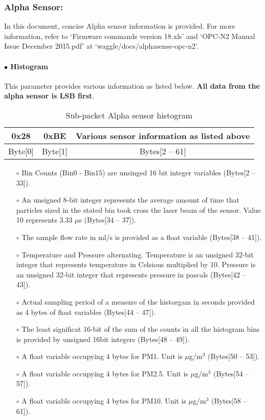 
\subsubsection{Alpha Sensor:}
In this document, concise Alpha sensor information is provided. For more information, refer to `Firmware commands version 18.xls' and `OPC-N2 Manual Issue December 2015.pdf' at `waggle/docs/alphasense-opc-n2'.

\paragraph{$\bullet$ Histogram}
This parameter provides various information as listed below. \textbf{All data from the alpha sensor is LSB first}. 


\begin{table}[h!]
    \centering
    \caption{Sub-packet Alpha sensor histogram}
    \begin{tabular}{|c|c|c|}
        \hline
        \rowcolor{black!8}
        \textbf{0x28} & \textbf{0xBE} & \textbf{Various sensor information as listed above}\\
        \hline
        Byte[0] & Byte[1] & Bytes[2 -- 61] \\ \hline
    \end{tabular}
\end{table}


\begin{itemize}
\setlength\itemsep{0em}
\item[$\circ$] Bin Counts (Bin0 - Bin15) are unsinged 16 bit integer variables (Bytes[2 -- 33]).
\item[$\circ$] An unsigned 8-bit integer represents the average amount of time that particles sized in the stated bin took cross the laser beam of the sensor. Value 10 represents 3.33 $\mu$s (Bytes[34 -- 37]).
\item[$\circ$] The sample flow rate in ml/s is provided as a float variable (Bytes[38 -- 41]).
\item[$\circ$] Temperature and Pressure alternating. Temperature is an unsigned 32-bit integer that represents temperature in Celsious multiplied by 10. Pressure is an unsigned 32-bit integer that represents pressure in pascals (Bytes[42 -- 43]).
\item[$\circ$] Actual sampling period of a measure of the historgam in seconds provided as 4 bytes of float variables (Bytes[44 -- 47]).
\item[$\circ$] The least significat 16-bit of the sum of the counts in all the histogram bins is provided by unsigned 16bit integers (Bytes[48 -- 49]).
\item[$\circ$] A float variable occupying 4 bytes for PM1. Unit is $\mu$g/m$^3$ (Bytes[50 -- 53]).
\item[$\circ$] A float variable occupying 4 bytes for PM2.5. Unit is $\mu$g/m$^3$ (Bytes[54 -- 57]).
\item[$\circ$] A float variable occupying 4 bytes for PM10. Unit is $\mu$g/m$^3$ (Bytes[58 -- 61]).\\
\end{itemize}


